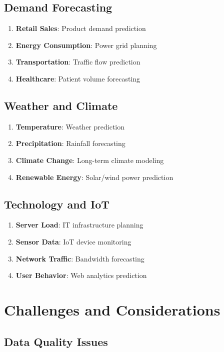 \documentclass[11pt,a4paper]{article}
\begin{document}
\subsection{Demand Forecasting}

\begin{enumerate}
\item \textbf{Retail Sales}: Product demand prediction
\item \textbf{Energy Consumption}: Power grid planning
\item \textbf{Transportation}: Traffic flow prediction
\item \textbf{Healthcare}: Patient volume forecasting
\end{enumerate}

\subsection{Weather and Climate}

\begin{enumerate}
\item \textbf{Temperature}: Weather prediction
\item \textbf{Precipitation}: Rainfall forecasting
\item \textbf{Climate Change}: Long-term climate modeling
\item \textbf{Renewable Energy}: Solar/wind power prediction
\end{enumerate}

\subsection{Technology and IoT}

\begin{enumerate}
\item \textbf{Server Load}: IT infrastructure planning
\item \textbf{Sensor Data}: IoT device monitoring
\item \textbf{Network Traffic}: Bandwidth forecasting
\item \textbf{User Behavior}: Web analytics prediction
\end{enumerate}

\section{Challenges and Considerations}

\subsection{Data Quality Issues}
\end{document}
